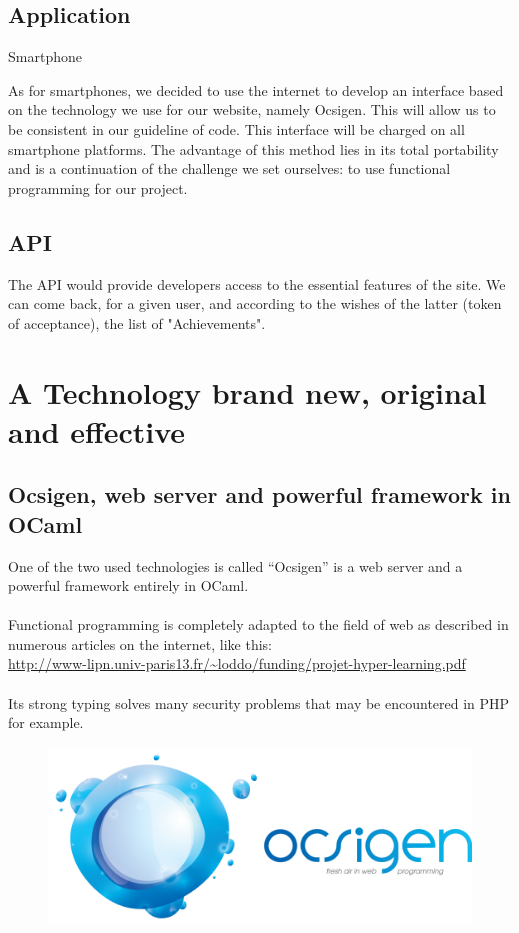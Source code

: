 \documentclass {life-en}
\begin{document}
\section{Application} Smartphone

As for smartphones, we decided to use the internet to develop an interface based on the technology we use for our website, namely Ocsigen. This will allow us to be consistent in our guideline of code. This interface will be charged on all smartphone platforms. The advantage of this method lies in its total portability and is a continuation of the challenge we set ourselves: to use functional programming for our project.

\section{API}

The API would provide developers access to the essential features of the site. We can come back, for a given user, and according to the wishes of the latter (token of acceptance), the list of "Achievements".



\chapter{A Technology brand new, original and effective}

\section{Ocsigen, web server and powerful framework in OCaml}

One of the two used technologies is called ``Ocsigen'' is a web server and a powerful framework entirely in OCaml.\\
  \\
Functional programming is completely adapted to the field of web as described in numerous articles on the internet, like this: \\
\url{http://www-lipn.univ-paris13.fr/~loddo/funding/projet-hyper-learning.pdf} \\
\\
Its strong typing solves many security problems that may be encountered in PHP for example.\\

\begin{figure} [H]
  \begin{center}
    \includegraphics [width = 13cm]{img/ocsigen.png}
  \end{center}
\end{figure}
\end{document}
